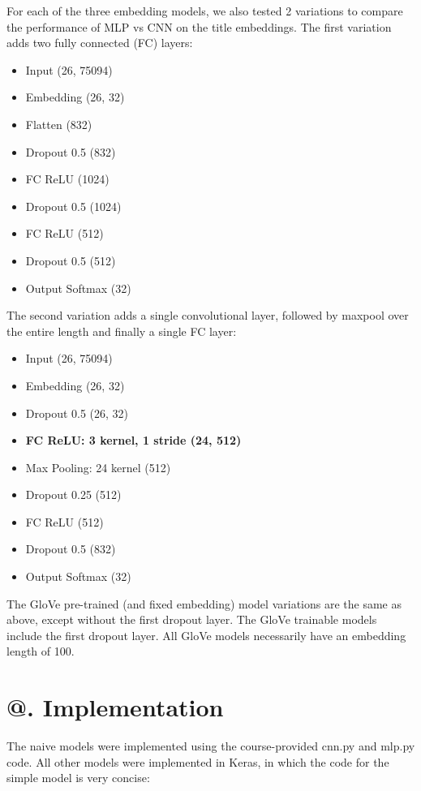 \documentclass[jou,apacite, 10px]{apa6}
\makeatletter
\newcommand*{\rom}[1]{\expandafter\@slowromancap\romannumeral #1@}
\makeatother
\begin{document}
For each of the three embedding models, we also tested 2 variations to compare the performance of MLP vs CNN on the title embeddings. The first variation adds two fully connected (FC) layers:

\begin{itemize}
    \item Input (26, 75094)
    \item Embedding (26, 32)
    \item Flatten (832)
    \item Dropout 0.5 (832)
    \item FC ReLU (1024)
    \item Dropout 0.5 (1024)
    \item FC ReLU (512)
    \item Dropout 0.5 (512)
    \item Output Softmax (32)
\end{itemize}

The second variation adds a single convolutional layer, followed by maxpool over the entire length and finally a single FC layer:

\begin{itemize}
    \item Input (26, 75094)
    \item Embedding (26, 32)
    \item Dropout 0.5 (26, 32)
    \item \textbf{FC ReLU: 3 kernel, 1 stride (24, 512)}
    \item Max Pooling: 24 kernel (512)
    \item Dropout 0.25 (512)
    \item FC ReLU (512)
    \item Dropout 0.5 (832)
    \item Output Softmax (32)
\end{itemize}

The GloVe pre-trained (and fixed embedding) model variations are the same as above, except without the first dropout layer. The GloVe trainable models include the first dropout layer. All GloVe models necessarily have an embedding length of 100.

\section{\rom{4}. Implementation}

The naive models were implemented using the course-provided cnn.py and mlp.py code. All other models were implemented in Keras, in which the code for the simple model is very concise:\\
\end{document}
